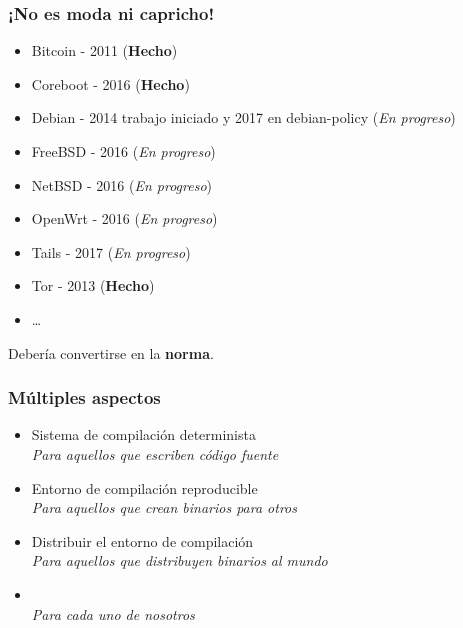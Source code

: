 \documentclass[14pt,aspectratio=169]{beamer}
\begin{document}
\begin{frame}
\frametitle{¡No es moda ni capricho!}

\begin{itemize}
\item Bitcoin - 2011 (\textbf{Hecho})
\item Coreboot - 2016 (\textbf{Hecho})
\item Debian - 2014 trabajo iniciado y 2017 en debian-policy (\emph{En progreso})
\item FreeBSD - 2016 (\emph{En progreso})
\item NetBSD - 2016 (\emph{En progreso})
\item OpenWrt - 2016 (\emph{En progreso})
\item Tails - 2017 (\emph{En progreso})
\item Tor - 2013 (\textbf{Hecho})
\item \ldots{}
\end{itemize}

\end{frame}

\begin{frame}[plain]
\begin{center}
\Huge Debería convertirse en la \textbf{norma}.


\end{center}
\end{frame}

\begin{frame}
\frametitle{Múltiples aspectos}

\begin{itemize}
\item Sistema de compilación determinista \\
  \textit{\small Para aquellos que escriben código fuente}
\item Entorno de compilación reproducible \\
  \textit{\small Para aquellos que crean binarios para otros}
\item Distribuir el entorno de compilación \\
  \textit{\small Para aquellos que distribuyen binarios al mundo}
\item \color{gray}{Realizar una recompilación y verificar los resultados} \\
  \textit{\small Para cada uno de nosotros}
\end{itemize}

\end{frame}
\end{document}
